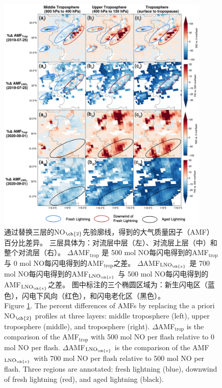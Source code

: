 \begin{figure}[H]
    \centering
    \includegraphics[width=0.9\textwidth]{./figures/china_s5p_amf_diff.png}
    \caption{
    通过替换三层的NO$_{\ch{2}}$先验廓线，得到的大气质量因子（AMF）百分比差异。
    三层具体为：对流层中层（左）、对流层上层（中）和整个对流层（右）。
     $\Delta$AMF$_\textrm{trop}$ 是 500 mol NO每闪电得到的AMF$_\textrm{trop}$ 与 0 mol NO每闪电得到的AMF$_\textrm{trop}$之差。
     $\Delta$AMF$_\textrm{LNO$_{\ch{x}}$}$ 是 700 mol NO每闪电得到的AMF$_\textrm{LNO$_{\ch{x}}$}$ 与 500 mol NO每闪电得到的AMF$_\textrm{LNO$_{\ch{x}}$}$之差。
     图中标注的三个椭圆区域为：新生闪电区（蓝色），闪电下风向（红色），和闪电老化区（黑色）。\\
    Figure \ref{fig:china_s5p_amf_diff}. The percent differences of AMFs by replacing the a priori NO$_{\ch{2}}$ profiles at three layers:
    middle troposphere (left), upper troposphere (middle), and troposphere (right).
    $\Delta$AMF$_\textrm{trop}$ is the comparison of the AMF$_\textrm{trop}$ with 500 mol NO per flash relative to 0 mol NO per flash.
    $\Delta$AMF$_\textrm{LNO$_{\ch{x}}$}$ is the comparison of the AMF$_\textrm{LNO$_{\ch{x}}$}$ with 700 mol NO per flash relative to 500 mol NO per flash.
    Three regions are annotated: fresh lightning (blue),
    downwind of fresh lightning (red),
    and aged lightning (black).
    }
    \label{fig:china_s5p_amf_diff}
\end{figure}


